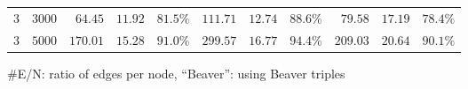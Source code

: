 \begin{table*}[!t]
\begin{tabular}{c|c|r|r|r|r|r|r|r|r|r}
 	$3$ & $3000$ & $64.45$ & $11.92$ & {$81.5\%$} & $111.71$ & $12.74$ & {$88.6\%$} & $79.58$ & $17.19$ & {$78.4\%$} \\
 	$3$ & $5000$ & $170.01$ & $15.28$ & {$\mathbf{91.0\%}$} & $299.57$ & $16.77$ & {$\mathbf{94.4\%}$} & $209.03$ & $20.64$ & {$\mathbf{90.1\%}$} \\
 	\hline
 	 	\end{tabular}
        
 	 $\#$E/N: ratio of edges per node,
	``Beaver'': using Beaver triples
\end{table*}

